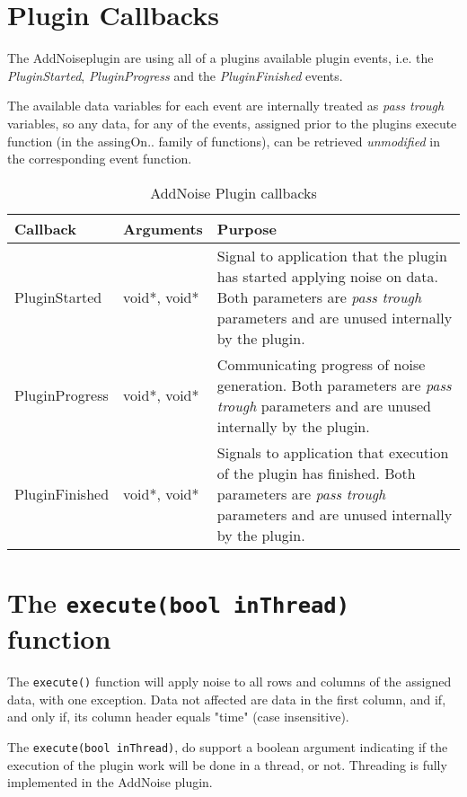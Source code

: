 \section{Plugin Callbacks}
The AddNoiseplugin are using all of a plugins available plugin events, i.e. the \emph{PluginStarted}, \emph{PluginProgress} and the \emph{PluginFinished} events.

The available data variables for each event are internally treated as \emph{pass trough} variables, so any data, for any of the events, assigned prior to 
the plugins execute function (in the assingOn.. family of functions), can be retrieved \emph{unmodified} in the corresponding event function.
\begin{table}[ht]
\centering %
\begin{tabular}{l l p{7.5cm}} %

Callback & Arguments & Purpose \\ [0.5ex] %
\hline %
\hline %
PluginStarted  	& 	void*, void*  & Signal to application that the plugin has started applying noise on data. Both parameters are \emph{pass trough} parameters and are unused internally by the plugin.\\[0.5ex]
PluginProgress	& 	void*, void*  & Communicating progress of noise generation. Both parameters are \emph{pass trough} parameters and are unused internally by the plugin. \\[0.5ex]
PluginFinished	& 	void*, void*  & Signals to application that execution of the plugin has finished. Both parameters are \emph{pass trough} parameters and are unused internally by the plugin.\\

\hline %
\end{tabular}
\caption{AddNoise Plugin callbacks} 
\label{table:AddNoisePluginCallBacks} 
\end{table}

\section{The \texttt{execute(bool inThread)} function}
The \verb|execute()| function will apply noise to all rows and columns of the assigned data, with one exception. Data not affected are data in the first column, and if, and only if, its column header equals "time" (case insensitive). 

The \verb|execute(bool inThread)|, do support a boolean argument indicating if the execution of the plugin work will be done in a thread, or not. Threading is fully implemented in the AddNoise plugin.

